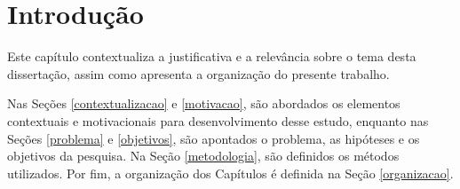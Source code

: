 \chapter{Introdução}
\label{chap:intro}

Este capítulo contextualiza a justificativa e a relevância sobre o tema desta dissertação, assim como apresenta a organização do presente trabalho. 

Nas Seções \ref{contextualizacao} e \ref{motivacao}, são abordados os elementos contextuais e motivacionais para desenvolvimento desse estudo, enquanto nas Seções \ref{problema} e \ref{objetivos}, são apontados o problema, as hipóteses e os objetivos da pesquisa. Na Seção \ref{metodologia}, são definidos os métodos utilizados. Por fim, a organização dos Capítulos é definida na Seção \ref{organizacao}.

 

  
  
  
 
 
      
 
 
 

 
% 
 
% 

%

%

%  
